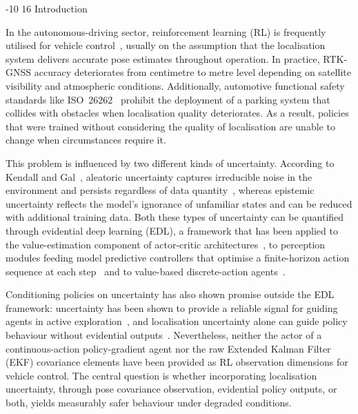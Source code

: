 \documentclass{sig-alternate}
\makeatletter
\renewcommand\section{\@startsection{section}{1}{\z@}%
    {-10\p@ \@plus -4\p@ \@minus -2\p@}%
    {16\p@}%
    {\baselineskip 14pt\secfnt\@ucheadtrue}}
\makeatother
\begin{document}
\section{Introduction}
\label{sec:introduction}

In the autonomous-driving sector, reinforcement learning (RL) is frequently utilised for vehicle control~\cite{yurtsever2020survey}, usually on the assumption that the localisation system delivers accurate pose estimates throughout operation. In practice, RTK-GNSS accuracy deteriorates from centimetre to metre level depending on satellite visibility and atmospheric conditions. Additionally, automotive functional safety standards like ISO~26262~\cite{iso26262} prohibit the deployment of a parking system that collides with obstacles when localisation quality deteriorates. As a result, policies that were trained without considering the quality of localisation are unable to change when circumstances require it.

This problem is influenced by two different kinds of uncertainty. According to Kendall and Gal~\cite{kendall2017uncertainties}, aleatoric uncertainty captures irreducible noise in the environment and persists regardless of data quantity~\cite{charpentier2022disentangling}, whereas epistemic uncertainty reflects the model's ignorance of unfamiliar states and can be reduced with additional training data. Both these types of uncertainty can be quantified through evidential deep learning (EDL), a framework that has been applied to the value-estimation component of actor-critic architectures~\cite{akgul2025eppo}, to perception modules feeding model predictive controllers that optimise a finite-horizon action sequence at each step~\cite{ham2025dro} and to value-based discrete-action agents~\cite{stutts2024ceqr}.

Conditioning policies on uncertainty has also shown promise outside the EDL framework: uncertainty has been shown to provide a reliable signal for guiding agents in active exploration~\cite{placed2020active}, and localisation uncertainty alone can guide policy behaviour without evidential outputs~\cite{puthumanaillam2025guided}. Nevertheless, neither the actor of a continuous-action policy-gradient agent nor the raw Extended Kalman Filter (EKF) covariance elements have been provided as RL observation dimensions for vehicle control. The central question is whether incorporating localisation uncertainty, through pose covariance observation, evidential policy outputs, or both, yields measurably safer behaviour under degraded conditions.
\end{document}
